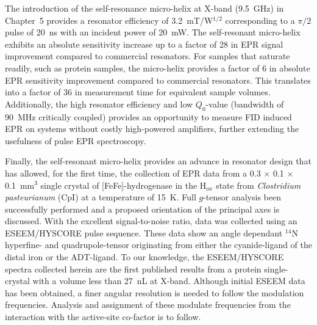 The introduction of the self-resonance micro-helix at X-band (9.5~GHz) in Chapter~5 provides a resonator efficiency of 3.2~mT/W$^{1/2}$ corresponding to a $\pi/2$ pulse of 20~ns with an incident power of 20~mW. The self-resonant micro-helix exhibits an absolute sensitivity increase up to a factor of 28 in EPR signal improvement compared to commercial resonators. For samples that saturate readily, such as protein samples, the micro-helix provides a factor of 6 in absolute EPR sensitivity improvement compared to commercial resonators. This translates into a factor of 36 in measurement time for equivalent sample volumes. Additionally, the high resonator efficiency and low $Q_0$-value (bandwidth of 90~MHz critically coupled) provides an opportunity to measure FID induced EPR on systems without costly high-powered amplifiers, further extending the usefulness of pulse EPR spectroscopy.

Finally, the self-resonant micro-helix provides an advance in resonator design that has allowed, for the first time, the collection of EPR data from a 0.3 $\times$ 0.1 $\times$ 0.1~mm$^3$ single crystal of [FeFe]-hydrogenase in the H$_{ox}$ state from {\em Clostridium pasteurianum} (CpI) at a temperature of 15~K. Full $g$-tensor analysis been successfully performed and a proposed orientation of the principal axes is discussed. With the excellent signal-to-noise ratio, data was collected using an ESEEM/HYSCORE pulse sequence. These data show an angle dependant $^{14}$N hyperfine- and quadrupole-tensor originating from either the cyanide-ligand of the distal iron or the ADT-ligand.  To our knowledge, the ESEEM/HYSCORE spectra collected herein are the first published results from a protein single-crystal with a volume less than 27~nL at X-band. Although initial ESEEM data has been obtained, a finer angular resolution is needed to follow the modulation frequencies. Analysis and assignment of these modulate frequencies from the interaction with the active-site co-factor is to follow. 




{\renewcommand{\bibsection}{\clearpage\section*{\bibname}\markboth{\bibname}{\bibname}}
\renewcommand{\bibname}{REFERENCES}


}